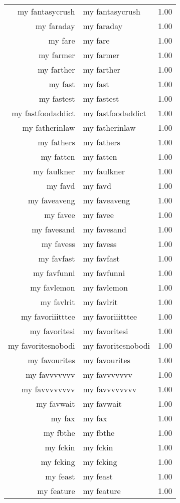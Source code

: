 \begin{table}[ht]
\begin{tabular}{rlr}
  my fantasycrush & my fantasycrush & 1.00 \\ 
  my faraday & my faraday & 1.00 \\ 
  my fare & my fare & 1.00 \\ 
  my farmer & my farmer & 1.00 \\ 
  my farther & my farther & 1.00 \\ 
  my fast & my fast & 1.00 \\ 
  my fastest & my fastest & 1.00 \\ 
  my fastfoodaddict & my fastfoodaddict & 1.00 \\ 
  my fatherinlaw & my fatherinlaw & 1.00 \\ 
  my fathers & my fathers & 1.00 \\ 
  my fatten & my fatten & 1.00 \\ 
  my faulkner & my faulkner & 1.00 \\ 
  my favd & my favd & 1.00 \\ 
  my faveaveng & my faveaveng & 1.00 \\ 
  my favee & my favee & 1.00 \\ 
  my favesand & my favesand & 1.00 \\ 
  my favess & my favess & 1.00 \\ 
  my favfast & my favfast & 1.00 \\ 
  my favfunni & my favfunni & 1.00 \\ 
  my favlemon & my favlemon & 1.00 \\ 
  my favlrit & my favlrit & 1.00 \\ 
  my favoriiitttee & my favoriiitttee & 1.00 \\ 
  my favoritesi & my favoritesi & 1.00 \\ 
  my favoritesnobodi & my favoritesnobodi & 1.00 \\ 
  my favourites & my favourites & 1.00 \\ 
  my favvvvvvv & my favvvvvvv & 1.00 \\ 
  my favvvvvvvv & my favvvvvvvv & 1.00 \\ 
  my favwait & my favwait & 1.00 \\ 
  my fax & my fax & 1.00 \\ 
  my fbthe & my fbthe & 1.00 \\ 
  my fckin & my fckin & 1.00 \\ 
  my fcking & my fcking & 1.00 \\ 
  my feast & my feast & 1.00 \\ 
  my feature & my feature & 1.00 \\ 

\end{tabular}
\end{table}
